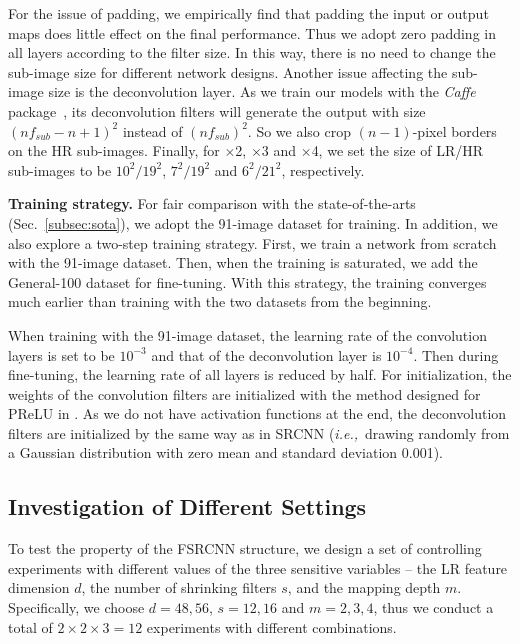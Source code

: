 \documentclass[runningheads]{llncs}
\newcommand{\ie}{\emph{i.e.,}}
\begin{document}
For the issue of padding, we empirically find that padding the input or output maps does little effect on the final performance. Thus we adopt zero padding in all layers according to the filter size. In this way, there is no need to change the sub-image size for different network designs.
Another issue affecting the sub-image size is the deconvolution layer. As we train our models with the \textit{Caffe} package~\cite{Jia2014}, its deconvolution filters will generate the output with size $(nf_{sub}-n+1)^2$ instead of $(nf_{sub})^2$. So we also crop $(n-1)$-pixel borders on the HR sub-images. Finally, for $\times$2, $\times$3 and $\times$4, we set the size of LR/HR sub-images to be $10^2/19^2$, $7^2/19^2$ and $6^2/21^2$, respectively.

\noindent
\textbf{Training strategy.}
For fair comparison with the state-of-the-arts (Sec.~\ref{subsec:sota}), we adopt the 91-image dataset for training. In addition, we also explore a two-step training strategy. First, we train a network from scratch with the 91-image dataset. Then, when the training is saturated, we add the General-100 dataset for fine-tuning. With this strategy, the training converges much earlier than training with the two datasets from the beginning.

When training with the 91-image dataset, the learning rate of the convolution layers is set to be $10^{-3}$ and that of the deconvolution layer is $10^{-4}$. Then during fine-tuning, the learning rate of all layers is reduced by half. For initialization, the weights of the convolution filters are initialized with the method designed for PReLU in \cite{He2015}. As we do not have activation functions at the end, the deconvolution filters are initialized by the same way as in SRCNN (\ie~drawing randomly from a Gaussian distribution with zero mean and standard deviation 0.001).

\subsection{Investigation of Different Settings}
\label{sec:Investigation}
To test the property of the FSRCNN structure, we design a set of controlling experiments with different values of the three sensitive variables -- the LR feature dimension $d$, the number of shrinking filters $s$, and the mapping depth $m$. Specifically, we choose $d=48,56$, $s=12,16$ and $m=2,3,4$, thus we conduct a total of $2\times 2\times 3=12$ experiments with different combinations.
\end{document}
